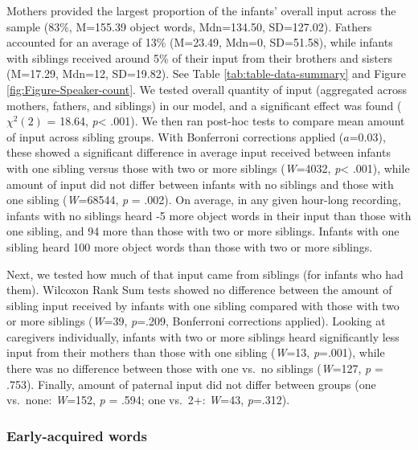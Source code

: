 \documentclass[
  english,
  man,floatsintext]{apa6}
\begin{document}
Mothers provided the largest proportion of the infants' overall input across the sample (83\%, M=155.39 object words, Mdn=134.50, SD=127.02). Fathers accounted for an average of 13\% (M=23.49, Mdn=0, SD=51.58), while infants with siblings received around 5\% of their input from their brothers and sisters (M=17.29, Mdn=12, SD=19.82). See Table \ref{tab:table-data-summary} and Figure \ref{fig:Figure-Speaker-count}. We tested overall quantity of input (aggregated across mothers, fathers, and siblings) in our model, and a significant effect was found (\(\chi^2 (2)\) = 18.64, \emph{p}\textless{} .001). We then ran post-hoc tests to compare mean amount of input across sibling groups. With Bonferroni corrections applied (\(a\)=0.03), these showed a significant difference in average input received between infants with one sibling versus those with two or more siblings (\emph{W}=4032, \emph{p}\textless{} .001), while amount of input did not differ between infants with no siblings and those with one sibling (\emph{W}=68544, \emph{p} = .002). On average, in any given hour-long recording, infants with no siblings heard -5 more object words in their input than those with one sibling, and 94 more than those with two or more siblings. Infants with one sibling heard 100 more object words than those with two or more siblings.

Next, we tested how much of that input came from siblings (for infants who had them). Wilcoxon Rank Sum tests showed no difference between the amount of sibling input received by infants with one sibling compared with those with two or more siblings (\emph{W}=39, \emph{p}=.209, Bonferroni corrections applied). Looking at caregivers individually, infants with two or more siblings heard significantly less input from their mothers than those with one sibling (\emph{W}=13, \emph{p}=.001), while there was no difference between those with one vs.~no siblings (\emph{W}=127, \emph{p} = .753). Finally, amount of paternal input did not differ between groups (one vs.~none: \emph{W}=152, \emph{p} = .594; one vs.~2+: \emph{W}=43, \emph{p}=.312).

\hypertarget{early-acquired-words}{%
\subsubsection{Early-acquired words}\label{early-acquired-words}}
\end{document}
